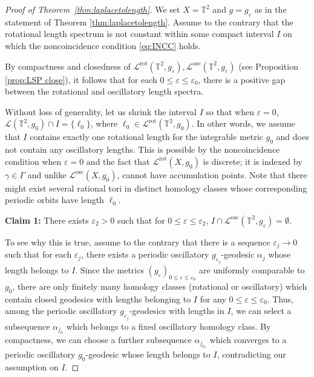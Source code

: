 \documentclass[11pt,letterpaper,oneside]{amsart}
\newcommand{\T}{\mathbb{T}}
\theoremstyle{definition}
\theoremstyle{remark}
\newcommand{\eps}{\varepsilon}
\theoremstyle{definition}
\theoremstyle{remark}
\newcommand{\CL}{\mathcal{L}}
\DeclareMathOperator{\rot}{rot}
\DeclareMathOperator{\osc}{osc}
\begin{document}
\begin{proof}[Proof of Theorem~\ref{thm:laplacetolength}]
    We set $X = \T^2$ and $g = g_\eps$ as in the statement of Theorem \ref{thm:laplacetolength}. Assume to the contrary that the rotational length spectrum is not constant within some compact interval $I$ on which the noncoincidence condition \eqref{eq:INCC} holds. {By compactness and closedness of $\CL^{\rot}(\T^2, g_\eps), \CL^{\osc}(\T^2,g_\eps)$ (see Proposition \ref{prop:LSP close}), it follows that for each $0 \leq \eps \leq \eps_0$, there is a positive gap between the rotational and oscillatory length spectra.
    
    \medskip 
    
    Without loss of generality, let us shrink the interval $I$ so that when $\eps = 0$, $\CL(\T^2, g_0) \cap I = \{\ell_0\}$, where $\ell_0 \in \CL^{\rot}(\T^2,g_0)$. In other words, we assume that $I$ contains exactly one rotational length for the integrable metric $g_0$ and does not contain any oscillatory lengths. This is possible by the noncoincidence condition when $\eps = 0$ and the fact that $\CL^{\rot}(X, g_0)$ is discrete; it is indexed by $\gamma \in \Gamma$ and unlike $\CL^{\osc}(X,g_0)$, cannot have accumulation points. Note that there might exist several rational tori in distinct homology classes whose corresponding periodic orbits have length $\ell_0$.
    
    \medskip
    
    \noindent \textbf{Claim 1:} There exists $\eps_2 > 0$ such that for $0 \leq \eps \leq \eps_2$, $I \cap \CL^{\osc}(\T^2, g_\eps) = \emptyset$.
    
    \medskip
    
    To see why this is true, assume to the contrary that there is a sequence $\eps_j \to 0$ such that for each $\eps_j$, there exists a periodic oscillatory $g_{\eps_j}$-geodesic $\alpha_j$ whose length belongs to $I$. Since the metrics $(g_\eps)_{0 \leq \eps \leq \eps_0}$ are uniformly comparable to $g_0$, there are only finitely many homology classes (rotational or oscillatory) which contain closed geodesics with lengths belonging to $I$ for any $0 \leq \eps \leq \eps_0$. Thus, among the periodic oscillatory $g_{\eps_j}$-geodesics with lengths in $I$, we can select a subsequence $\alpha_{j_k}$ which belongs to a fixed oscillatory homology class. By compactness, we can choose a further subsequence $\alpha_{j_{k_\ell}}$ which converges to a periodic oscillatory $g_0$-geodesic whose length belongs to $I$, contradicting our assumption on $I$.
    
}
\end{proof}
\end{document}
